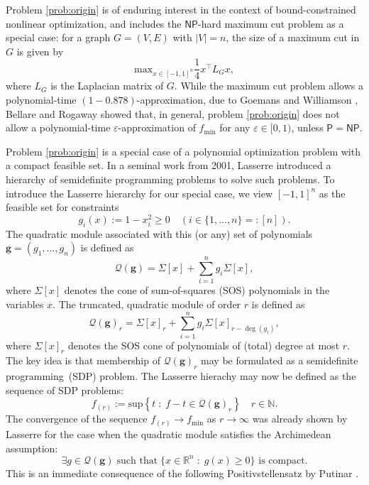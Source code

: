 \documentclass[11pt]{article}
\newcommand{\N}{\mathbb{N}}
\newcommand{\R}{\mathbb{R}}
\renewcommand{\sup}{\mathrm{sup}}
\renewcommand{\min}{\mathrm{min}}
\renewcommand{\max}{\mathrm{max}}
\theoremstyle{definition}
\begin{document}
Problem \eqref{prob:origin} is of enduring interest in the context of bound-constrained nonlinear optimization, and includes
the $\mathsf{NP}$-hard maximum cut problem as a special case: for a graph $G = (V,E)$ with $|V| = n$, the size of a maximum cut in $G$ is given by
\[
\max_{x \in [-1,1]^n} \frac{1}{4}x^\top L_G x,
\]
where $L_G$ is the Laplacian matrix of $G$. While the maximum cut problem allows a  polynomial-time $(1-0.878)$-approximation,
due to Goemans and Williamson \cite{10.1145/227683.227684},
 Bellare and Rogaway \cite{10.5555/3226669.3227146}
showed that, in general, problem \eqref{prob:origin} does not allow a polynomial-time
 $\varepsilon$-approximation of $f_\min$ for any $\varepsilon \in [0,1)$, unless $\mathsf{P}=\mathsf{NP}$.


Problem \eqref{prob:origin} is a special case of a polynomial optimization problem with a compact feasible set.
In a seminal work from 2001, Lasserre \cite{doi:10.1137/S1052623400366802} introduced a hierarchy of semidefinite programming problems to solve such problems.
To introduce the Lasserre hierarchy for our special case, we view $[-1,1]^n$ as the feasible set for constraints
\begin{equation}\label{g cube}
  g_i(x) := 1-x_i^2 \ge 0 \quad(i \in \{1,\ldots,n\} =: [n]).
\end{equation}
 The quadratic module associated with this (or any) set of polynomials $\mathbf{g} = (g_1,\ldots,g_n)$ is defined as
\begin{equation}\label{eq:quad mod}
  \mathcal{Q}(\mathbf{g}) = \Sigma[x] + \sum_{i=1}^n g_i \Sigma[x],
\end{equation}
where $\Sigma[x]$ denotes the cone of sum-of-squares (SOS) polynomials in the variables $x$.
The truncated, quadratic module of order $r$ is defined as
\[
\mathcal{Q}(\mathbf{g})_r = \Sigma[x]_r + \sum_{i=1}^n g_i \Sigma[x]_{r - \deg(g_i)},
\]
where $\Sigma[x]_r$ denotes the SOS cone of polynomials of (total) degree at most $r$.
The key idea is that membership of $\mathcal{Q}(\mathbf{g})_r$ may be formulated as a semidefinite programming~(SDP) problem.
The Lasserre hierachy may now be defined as the sequence of SDP problems:
\begin{equation}
\label{eq:lasserre hierarchy}
  f_{(r)} := \sup \left\{ t \; : \; f - t \in \mathcal{Q}(\mathbf{g})_r\right\} \quad r \in \N.
\end{equation}
The convergence of the sequence $f_{(r)} \rightarrow f_\min$ as $r \rightarrow \infty$ was already shown
by Lasserre \cite{doi:10.1137/S1052623400366802} for the case when the quadratic module satisfies the Archimedean assumption:
\begin{equation}
\label{Archimedean_property}
\exists g \in \mathcal{Q}(\mathbf{g}) \; \mbox{such that} \; \{x \in \R^n \; : \; g(x) \ge 0\} \mbox{ is compact.}
\end{equation}
 This is an immediate consequence
of the following Positivstellensatz by Putinar \cite{Putinar1993}.
\end{document}
